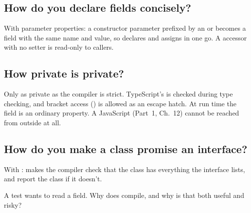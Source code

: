 \label{ch:c24}

\subsection{How do you declare fields concisely?}%
With parameter properties: a constructor parameter prefixed by an  or  becomes a field with the same name and value, so  declares and assigns  in one go. A  accessor with no setter is read-only to callers.

\subsection{How private is private?}%
Only as private as the compiler is strict. TypeScript's  is checked during type checking, and bracket access () is allowed as an escape hatch. At run time the field is an ordinary property. A JavaScript  (Part~1, Ch.~12) cannot be reached from outside at all.

\subsection{How do you make a class promise an interface?}%
With :  makes the compiler check that the class has everything the interface lists, and report the class if it doesn't.

\begin{ponder}A test wants to read a  field. Why does  compile, and why is that both useful and risky?\end{ponder}
